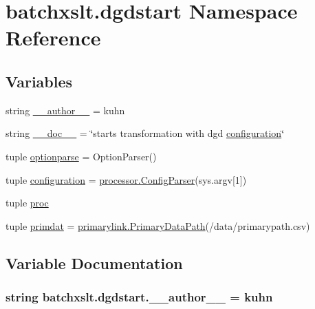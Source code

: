 \hypertarget{namespacebatchxslt_1_1dgdstart}{}\section{batchxslt.\+dgdstart Namespace Reference}
\label{namespacebatchxslt_1_1dgdstart}
\subsection*{Variables}
\begin{DoxyCompactItemize}
\item 
string \hyperlink{namespacebatchxslt_1_1dgdstart_afb7f8d3c40082d277c1d6261f92e4902}{\+\_\+\+\_\+author\+\_\+\+\_\+} = \textquotesingle{}kuhn\textquotesingle{}
\item 
string \hyperlink{namespacebatchxslt_1_1dgdstart_aa8f35e0a923480eaab98e43f2cf57ea0}{\+\_\+\+\_\+doc\+\_\+\+\_\+} = \char`\"{}starts transformation with dgd \hyperlink{namespacebatchxslt_1_1dgdstart_ae6be486e81d6e57d3022155e412359f2}{configuration}\char`\"{}
\item 
tuple \hyperlink{namespacebatchxslt_1_1dgdstart_a44ebd956e1c7db721b0536ccd3532068}{optionparse} = Option\+Parser()
\item 
tuple \hyperlink{namespacebatchxslt_1_1dgdstart_ae6be486e81d6e57d3022155e412359f2}{configuration} = \hyperlink{classbatchxslt_1_1processor_1_1_config_parser}{processor.\+Config\+Parser}(sys.\+argv\mbox{[}1\mbox{]})
\item 
tuple \hyperlink{namespacebatchxslt_1_1dgdstart_ab27d760c7fa3cb3833b6993c821ce2d8}{proc}
\item 
tuple \hyperlink{namespacebatchxslt_1_1dgdstart_a79662ea2cdd3dd916d9d7fa95876c1ae}{primdat} = \hyperlink{classbatchxslt_1_1primarylink_1_1_primary_data_path}{primarylink.\+Primary\+Data\+Path}(\textquotesingle{}/data/primarypath.\+csv\textquotesingle{})
\end{DoxyCompactItemize}


\subsection{Variable Documentation}
\hypertarget{namespacebatchxslt_1_1dgdstart_afb7f8d3c40082d277c1d6261f92e4902}{}
\subsubsection[{\+\_\+\+\_\+author\+\_\+\+\_\+}]{\setlength{\rightskip}{0pt plus 5cm}string batchxslt.\+dgdstart.\+\_\+\+\_\+author\+\_\+\+\_\+ = \textquotesingle{}kuhn\textquotesingle{}}\label{namespacebatchxslt_1_1dgdstart_afb7f8d3c40082d277c1d6261f92e4902}
\hypertarget{namespacebatchxslt_1_1dgdstart_aa8f35e0a923480eaab98e43f2cf57ea0}{}
